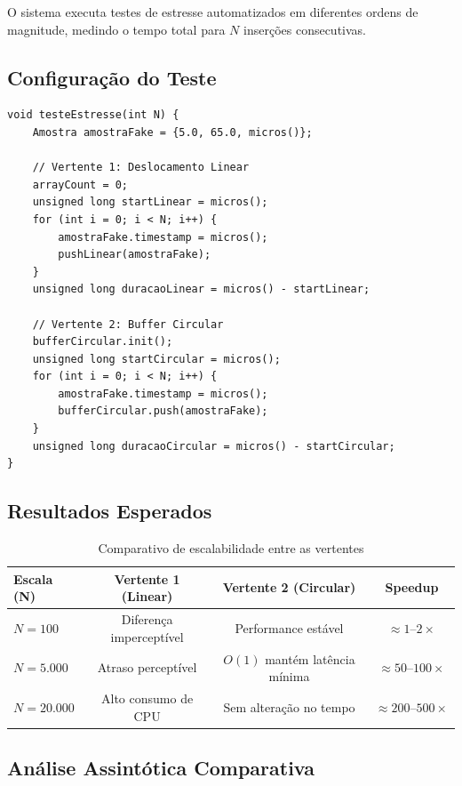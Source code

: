 \documentclass[12pt, a4paper]{article}
\begin{document}
O sistema executa testes de estresse automatizados em diferentes ordens de magnitude, medindo o tempo total para $N$ inserções consecutivas.

\subsection{Configuração do Teste}

\begin{lstlisting}[caption={Teste de estresse comparativo}]
void testeEstresse(int N) {
    Amostra amostraFake = {5.0, 65.0, micros()};

    // Vertente 1: Deslocamento Linear
    arrayCount = 0;
    unsigned long startLinear = micros();
    for (int i = 0; i < N; i++) {
        amostraFake.timestamp = micros();
        pushLinear(amostraFake);
    }
    unsigned long duracaoLinear = micros() - startLinear;

    // Vertente 2: Buffer Circular
    bufferCircular.init();
    unsigned long startCircular = micros();
    for (int i = 0; i < N; i++) {
        amostraFake.timestamp = micros();
        bufferCircular.push(amostraFake);
    }
    unsigned long duracaoCircular = micros() - startCircular;
}
\end{lstlisting}

\subsection{Resultados Esperados}

\begin{table}[H]
\centering
\caption{Comparativo de escalabilidade entre as vertentes}
\begin{tabular}{@{}lccc@{}}
\toprule
\textbf{Escala (N)} & \textbf{Vertente 1 (Linear)} & \textbf{Vertente 2 (Circular)} & \textbf{Speedup} \\
\midrule
$N = 100$    & Diferença imperceptível   & Performance estável    & $\approx 1\text{--}2\times$ \\
$N = 5.000$  & Atraso perceptível        & $O(1)$ mantém latência mínima & $\approx 50\text{--}100\times$ \\
$N = 20.000$ & Alto consumo de CPU       & Sem alteração no tempo & $\approx 200\text{--}500\times$ \\
\bottomrule
\end{tabular}
\end{table}

\subsection{Análise Assintótica Comparativa}
\end{document}
